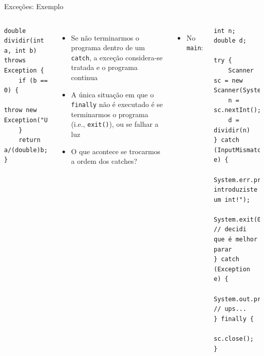 \documentclass[portuguese, aspectratio=169, xcolor=table]{beamer}
\begin{document}
\begin{frame}[fragile]{Exceções: Exemplo}
\scriptsize
\begin{columns}
\begin{verbatim}
double dividir(int a, int b) throws Exception {
    if (b == 0) {
        throw new Exception("Ups...");
    }
    return a/(double)b;
}
\end{verbatim}
\begin{itemize}

\item Se não terminarmos o programa dentro de um \texttt{catch}, a exceção considera-se tratada e o programa continua
\item A única situação em que o \texttt{finally} não é executado é se terminarmos o programa (i.e., \texttt{exit()}), ou se falhar a luz
\item O que acontece se trocarmos a ordem dos catches?
\end{itemize}
\begin{itemize}
\item No \texttt{main}:
\end{itemize}
\begin{verbatim}
int n;
double d;

try {
    Scanner sc = new Scanner(System.in);
    n = sc.nextInt();
    d = dividir(n)
} catch (InputMismatchException e) {
    System.err.print("Não introduziste um int!");
    System.exit(0);  // decidi que é melhor parar
} catch (Exception e) {
    System.out.println(e.getMessage()); // ups...
} finally {
    sc.close();
}
\end{verbatim}
\end{columns}
\end{frame}
\end{document}
